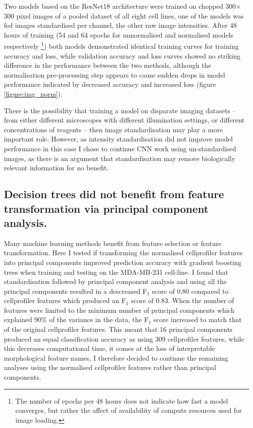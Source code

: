 \documentclass[a4paper,11pt,twoside,openright]{scrbook}
\begin{document}
Two models based on the ResNet18 architecture were trained on chopped 300$\times$300 pixel images of a pooled dataset of all eight cell lines, one of the models was fed images standardised per channel, the other raw image intensities.
After 48 hours of training (54 and 64 epochs for unnormalised and normalised models respectively \footnote{The number of epochs per 48 hours does not indicate how fast a model converges, but rather the affect of availability of compute resources used for image loading.}) both models demonstrated identical training curves for training accuracy and loss, while validation accuracy and loss curves showed no striking difference in the performance between the two methods, although the normalisation pre-processing step appears to cause sudden drops in model performance indicated by decreased accuracy and increased loss (figure \ref{figure:img_norm}).

There is the possibility that training a model on disparate imaging datasets -- from either different microscopes with different illumination settings, or different concentrations of reagents -- then image standardisation may play a more important role.
However, as intensity standardisation did not improve model performance in this case I chose to continue CNN work using un-standardised images, as there is an argument that standardisation may remove biologically relevant information for no benefit.


\subsection{Decision trees did not benefit from feature transformation via principal component analysis.}
Many machine learning methods benefit from feature selection or feature transformation.
Here I tested if transforming the normalised cellprofiler features into principal components improved prediction accuracy with gradient boosting trees when training and testing on the MDA-MB-231 cell-line.
I found that standardisation followed by principal component analysis and using all the principal components resulted in a descreased F$_1$ score of 0.80 compared to cellprofiler features which produced an F$_1$ score of 0.83.
When the number of features were limited to the minimum number of principal components which explained 90\% of the variance in the data, the F$_1$ score increased to match that of the original cellprofiler features.
This meant that 16 principal components produced an equal classification accuracy as using 309 cellprofiler features, while this decreases computational time, it comes at the loss of interpretable morphological feature names, I therefore decided to continue the remaining analyses using the normalised cellprofiler features rather than principal components.
\end{document}
